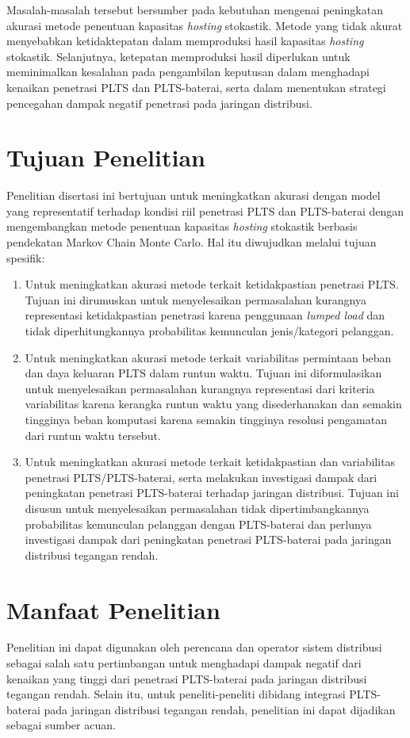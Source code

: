 Masalah-masalah tersebut bersumber pada kebutuhan mengenai peningkatan akurasi metode penentuan kapasitas \textit{hosting} stokastik. Metode yang tidak akurat menyebabkan ketidaktepatan dalam memproduksi hasil kapasitas \textit{hosting} stokastik. Selanjutnya, ketepatan memproduksi hasil diperlukan untuk meminimalkan kesalahan pada pengambilan keputusan dalam menghadapi kenaikan penetrasi PLTS dan PLTS-baterai, serta dalam menentukan strategi pencegahan dampak negatif penetrasi pada jaringan distribusi.

\section{Tujuan Penelitian}
Penelitian disertasi ini bertujuan untuk meningkatkan akurasi dengan model yang representatif terhadap kondisi riil penetrasi PLTS dan PLTS-baterai dengan mengembangkan metode penentuan kapasitas \textit{hosting} stokastik berbasis pendekatan Markov Chain Monte Carlo. Hal itu diwujudkan melalui tujuan spesifik:
\begin{enumerate}
    \item Untuk meningkatkan akurasi metode terkait ketidakpastian penetrasi PLTS. Tujuan ini dirumuskan untuk menyelesaikan permasalahan kurangnya representasi ketidakpastian penetrasi karena penggunaan \textit{lumped load} dan tidak diperhitungkannya probabilitas kemunculan jenis/kategori pelanggan.
    \item Untuk meningkatkan akurasi metode terkait variabilitas permintaan beban dan daya keluaran PLTS dalam runtun waktu. Tujuan ini diformulasikan untuk menyelesaikan permasalahan kurangnya representasi dari kriteria variabilitas karena kerangka runtun waktu yang disederhanakan dan semakin tingginya beban komputasi karena semakin tingginya resolusi pengamatan dari runtun waktu tersebut.
    \item Untuk meningkatkan akurasi metode terkait ketidakpastian dan variabilitas penetrasi PLTS/PLTS-baterai, serta melakukan investigasi dampak dari peningkatan penetrasi PLTS-baterai terhadap jaringan distribusi. Tujuan ini disusun untuk menyelesaikan permasalahan tidak dipertimbangkannya probabilitas kemunculan pelanggan dengan PLTS-baterai dan perlunya investigasi dampak dari peningkatan penetrasi PLTS-baterai pada jaringan distribusi tegangan rendah.
\end{enumerate}


\section{Manfaat Penelitian}
Penelitian ini dapat digunakan oleh perencana dan operator sistem distribusi sebagai salah satu pertimbangan untuk menghadapi dampak negatif dari kenaikan yang tinggi dari penetrasi PLTS-baterai pada jaringan distribusi tegangan rendah. Selain itu, untuk peneliti-peneliti dibidang integrasi PLTS-baterai pada jaringan distribusi tegangan rendah, penelitian ini dapat dijadikan sebagai sumber acuan. 


